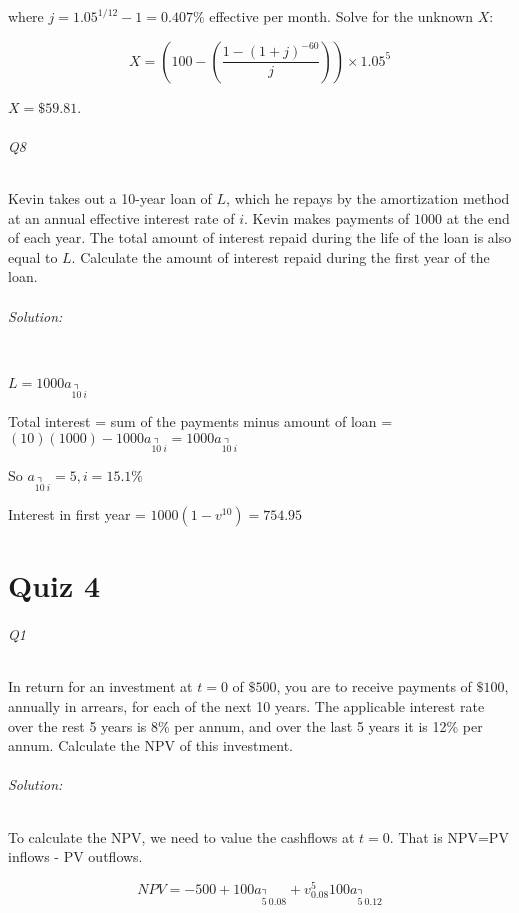 \documentclass[a4paper, 11pt, twoside]{article}
\begin{document}
where $j=1.05^{1/12}-1=0.407\%$ effective per month. Solve for the unknown $X$:

\[X=\left(100-\left(\frac{1-(1+j)^{-60}}{j}\right)\right)\times 1.05^5\]

$X=\$59.81$.

\paragraph{Q8} Kevin takes out a 10-year loan of $L$, which he repays by the amortization method at an annual effective interest rate of $i$. Kevin makes payments of $1000$ at the end of each year. The total amount of interest repaid during the life of the loan is also equal to $L$. Calculate the amount of interest repaid during the first year of the loan.

\paragraph{Solution:}\ \\
$L=1000a_{\annuity{10\ }i}$

Total interest = sum of the payments minus amount of loan = $(10)(1000)-1000a_{\annuity{10\ }i} =1000a_{\annuity{10\ }i}$

So $a_{\annuity{10\ }i}=5, i=15.1\%$

Interest in first year = $1000(1-v^{10})=754.95$

\part{Quiz 4}

\paragraph{Q1} In return for an investment at $t=0$ of $\$500$, you are to receive payments of $\$100$, annually in arrears, for each of the next 10 years. The applicable interest rate over the rest 5 years is 8\% per annum, and over the last 5 years it is 12\% per annum. Calculate the NPV of this investment.

\paragraph{Solution:} To calculate the NPV, we need to value the cashflows at $t=0$. That is NPV=PV inflows - PV outflows.

\[NPV = -500 + 100a_{\annuity{5\ }0.08} + v_{0.08}^5 100a_{\annuity{5\ }0.12}\]
\end{document}
